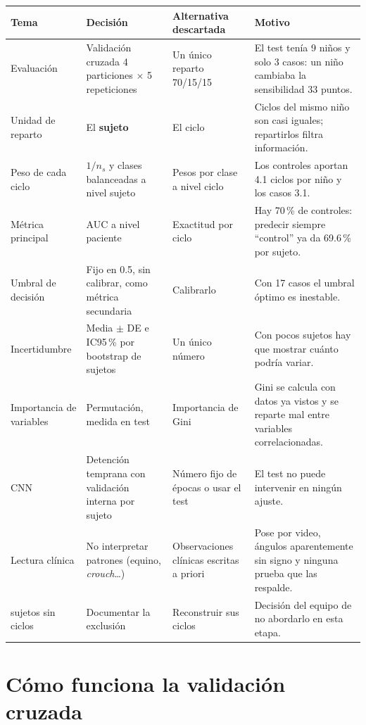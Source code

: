 \documentclass[11pt,a4paper]{article}
\begin{document}
\begin{longtable}{>{\raggedright\arraybackslash}p{2.5cm}>{\raggedright\arraybackslash}p{3.3cm}>{\raggedright\arraybackslash}p{3.2cm}>{\raggedright\arraybackslash}p{4.9cm}}
\toprule
\textbf{Tema} & \textbf{Decisión} & \textbf{Alternativa descartada} & \textbf{Motivo} \\
\midrule
\endhead
Evaluación & Validación cruzada 4 particiones $\times$ 5 repeticiones & Un único reparto 70/15/15 & El test tenía 9 niños y solo 3 casos: un niño cambiaba la sensibilidad 33 puntos. \\
Unidad de reparto & El \textbf{sujeto} & El ciclo & Ciclos del mismo niño son casi iguales; repartirlos filtra información. \\
Peso de cada ciclo & $1/n_s$ y clases balanceadas a nivel sujeto & Pesos por clase a nivel ciclo & Los controles aportan 4.1 ciclos por niño y los casos 3.1. \\
Métrica principal & AUC a nivel paciente & Exactitud por ciclo & Hay 70\,\% de controles: predecir siempre ``control'' ya da 69.6\,\% por sujeto. \\
Umbral de decisión & Fijo en 0.5, sin calibrar, como métrica secundaria & Calibrarlo & Con 17 casos el umbral óptimo es inestable. \\
Incertidumbre & Media $\pm$ DE e IC95\,\% por bootstrap de sujetos & Un único número & Con pocos sujetos hay que mostrar cuánto podría variar. \\
Importancia de variables & Permutación, medida en test & Importancia de Gini & Gini se calcula con datos ya vistos y se reparte mal entre variables correlacionadas. \\
CNN & Detención temprana con validación interna por sujeto & Número fijo de épocas o usar el test & El test no puede intervenir en ningún ajuste. \\
Lectura clínica & No interpretar patrones (equino, \emph{crouch}\dots) & Observaciones clínicas escritas a priori & Pose por video, ángulos aparentemente sin signo y ninguna prueba que las respalde. \\
12 sujetos sin ciclos & Documentar la exclusión & Reconstruir sus ciclos & Decisión del equipo de no abordarlo en esta etapa. \\
\bottomrule
\end{longtable}

\section{Cómo funciona la validación cruzada}
\end{document}
